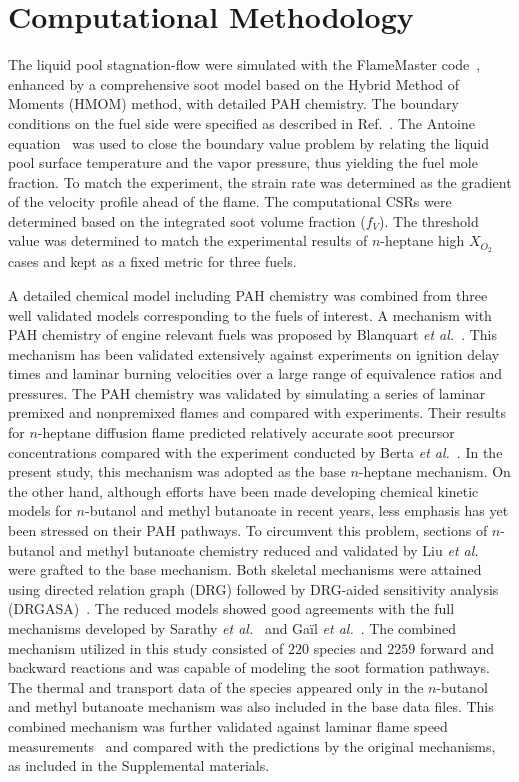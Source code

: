 \documentclass[preprint,3p,times,twocolumn]{elsarticleUS}
\begin{document}
\section{Computational Methodology}

The liquid pool stagnation-flow were simulated with the FlameMaster code~\cite{flamemaster}, enhanced by a comprehensive soot model based on the Hybrid Method of Moments (HMOM) method, with detailed PAH chemistry. The boundary conditions on the fuel side were specified as described in Ref.~\cite{buipham91}. The Antoine equation~\cite{polingbook} was used to close the boundary value problem by relating the liquid pool surface temperature and the vapor pressure, thus yielding the fuel mole fraction. To match the experiment, the strain rate was determined as the gradient of the velocity profile ahead of the flame. The computational CSRs were determined based on the integrated soot volume fraction ($f_V$). The threshold value was determined to match the experimental results of $n$-heptane high $X_{O_2}$ cases and kept as a fixed metric for three fuels.

A detailed chemical model including PAH chemistry was combined from three well validated models corresponding to the fuels of interest. A mechanism with PAH chemistry of engine relevant fuels was proposed by Blanquart \emph{et al.}~\cite{blanquart09b}. This mechanism has been validated extensively against experiments on ignition delay times and laminar burning velocities over a large range of equivalence ratios and pressures. The PAH chemistry was validated by simulating a series of laminar premixed and nonpremixed flames and compared with experiments. Their results for $n$-heptane diffusion flame predicted relatively accurate soot precursor concentrations compared with the experiment conducted by Berta \emph{et al.}~\cite{berta06}. In the present study, this mechanism was adopted as the base $n$-heptane mechanism. On the other hand, although efforts have been made developing chemical kinetic models for $n$-butanol and methyl butanoate in recent years, less emphasis has yet been stressed on their PAH pathways. To circumvent this problem, sections of $n$-butanol and methyl butanoate chemistry reduced and validated by Liu \emph{et al.}~\cite{liu11} were grafted to the base mechanism. Both skeletal mechanisms were attained using directed relation graph (DRG) followed by DRG-aided sensitivity analysis (DRGASA)~\cite{lu06a,lu06b,zheng07}. The reduced models showed good agreements with the full mechanisms developed by Sarathy \emph{et al.}~\cite{sarathy09} and Ga\"il \emph{et al.}~\cite{gail08}. The combined mechanism utilized in this study consisted of $220$ species and $2259$ forward and backward reactions and was capable of modeling the soot formation pathways. The thermal and transport data of the species appeared only in the $n$-butanol and methyl butanoate mechanism was also included in the base data files. This combined mechanism was further validated against laminar flame speed measurements~\cite{liu11} and compared with the predictions by the original mechanisms, as included in the Supplemental materials.
\end{document}
